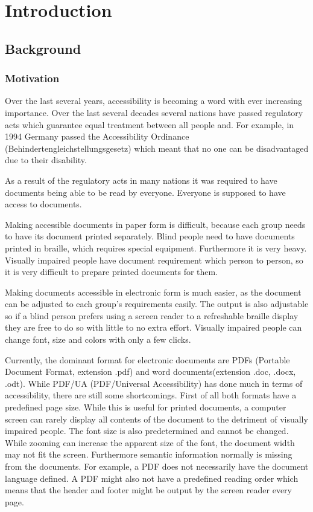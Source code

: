 
\chapter{Introduction}
\label{ch:Introduction}

\section{Background}

\subsection{Motivation}
Over the last several years, accessibility is becoming a word with ever increasing importance. Over the last several decades several nations have passed regulatory acts which guarantee equal treatment between all people and. For example, in 1994 Germany passed the Accessibility Ordinance (Behindertengleichstellungsgesetz) which meant that no one can be disadvantaged due to their disability.

As a result of the regulatory acts in many nations it was required to have documents being able to be read by everyone. Everyone is supposed to have access to documents.

Making accessible documents in paper form is difficult, because each group needs to have its document printed separately. Blind people need to have documents printed in braille, which requires special equipment. Furthermore it is very heavy. Visually impaired people have document requirement which person to person, so it is very difficult to prepare printed documents for them.

Making documents accessible in electronic form is much easier, as the document can be adjusted to each group's requirements easily. The output is also adjustable so if a blind person prefers using a screen reader to a refreshable braille display they are free to do so with little to no extra effort. Visually impaired people can change font, size and colors with only a few clicks.

Currently, the dominant format for electronic documents are PDFs (Portable Document Format, extension .pdf) and word documents(extension .doc, .docx, .odt). While PDF/UA (PDF/Universal Accessibility) has done much in terms of accessibility, there are still some shortcomings. First of all both formats have a predefined page size. While this is useful for printed documents, a computer screen can rarely display all contents of the document to the detriment of visually impaired people.\cite{EPUBzone} The font size is also predetermined and cannot be changed. While zooming can increase the apparent size of the font, the document width may not fit the screen. Furthermore semantic information normally is missing from the documents. For example, a PDF does not necessarily have the document language defined. A PDF might also not have a predefined reading order which means that the header and footer might be output by the screen reader every page. 

